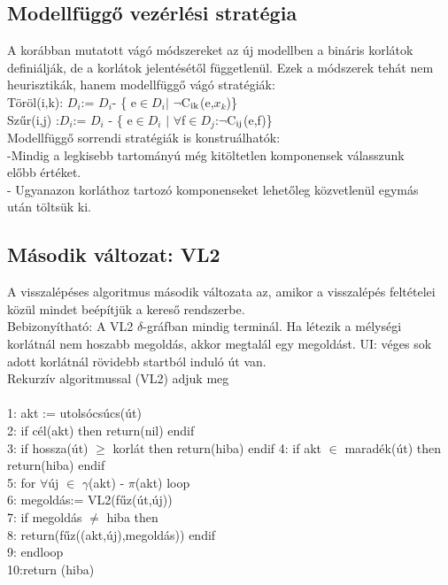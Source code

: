 \documentclass{article}
\begin{document}
	 \subsection{Modellfüggő vezérlési stratégia}
	 A korábban mutatott vágó módszereket az új modellben a bináris korlátok definiálják, de a korlátok jelentésétől függetlenül. Ezek a módszerek tehát nem heurisztikák, hanem modellfüggő vágó stratégiák:\\
	 \hspace*{1em} Töröl(i,k): $D_i$:= $D_i$- \{ e$\in$$D_i$$|$ $\neg$C$\textsubscript{ik}$(e,$x_k$)\}\\
	 \hspace*{1em} Szűr(i,j) :$D_i$:=  $D_i$ - \{ e$\in$$D_i$ $|$ $\forall$f$\in$$D_j$:$\neg$C$\textsubscript{ij}$(e,f)\}\\
	 Modellfüggő sorrendi stratégiák is konstruálhatók:\\
	 \hspace*{1em} -Mindig a legkisebb tartományú még kitöltetlen komponensek válasszunk\\
	 \hspace*{2em} előbb értéket.\\
	 \hspace*{1em}- Ugyanazon korláthoz tartozó komponenseket lehetőleg közvetlenül egymás\\
	 \hspace*{2em} után töltsük ki.\\
	 
	 \subsection{Második változat: VL2}
	 A visszalépéses algoritmus második változata az, amikor a visszalépés feltételei közül mindet beépítjük a kereső rendszerbe.\\
	 Bebizonyítható: A VL2 $\delta$-gráfban mindig terminál. Ha létezik a mélységi korlátnál nem hoszabb megoldás, akkor megtalál egy megoldást. UI: véges sok adott korlátnál rövidebb startból induló út van.\\
	 Rekurzív algoritmussal (VL2) adjuk meg\\ \\
	 1: akt := utolsó\textunderscore csúcs(út) \\
	 2: if cél(akt) then return(nil) endif \\
	 3: if hossza(út) $\geq$ korlát then return(hiba) endif
	 4: if akt $\in$ maradék(út) then return(hiba) endif \\
	 5: for $\forall$új $\in$ $\gamma$(akt) - $\pi$(akt) loop \\
	 6: \hspace{1em} megoldás:= VL2(fűz(út,új)) \\
	 7: \hspace{1em} if megoldás $\neq$ hiba then  \\
	 8: \hspace{2em} return(fűz((akt,új),megoldás)) endif \\
	 9: endloop \\
	 10:return (hiba) \\
	 
\end{document}
